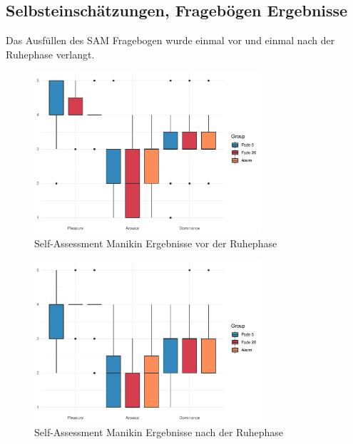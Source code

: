 \subsection{Selbsteinschätzungen, Fragebögen Ergebnisse}

Das Ausfüllen des SAM Fragebogen wurde einmal vor und einmal nach der Ruhephase verlangt. 

\begin{figure}[H]
	\centering
	\includegraphics[width=0.75\textwidth]{./_StudyResults/SAMpre}
	\caption{Self-Assessment Manikin Ergebnisse vor der Ruhephase}
	\label{fig:samPre}
\end{figure}
\begin{figure}[H]
	\centering
	\includegraphics[width=0.75\textwidth]{./_StudyResults/SAMpost}
	\caption{Self-Assessment Manikin Ergebnisse nach der Ruhephase}
	\label{fig:samPost}
\end{figure}


